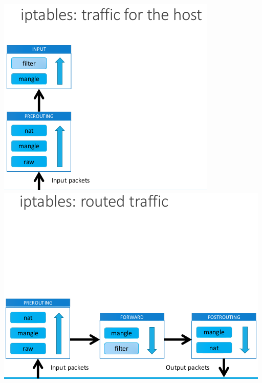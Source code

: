 \documentclass{article}
\begin{document}
\begin{center}
  \includegraphics[scale=0.35]{61}
  \includegraphics[scale=0.35]{62}
\end{center}
\end{document}
